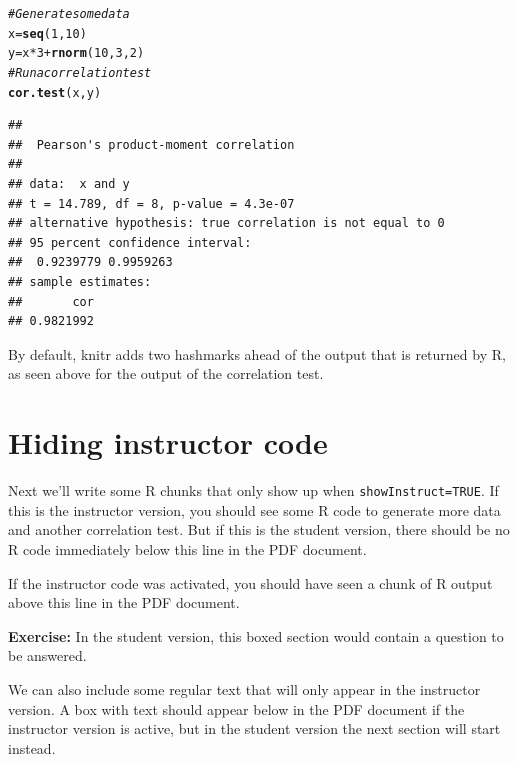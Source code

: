 \documentclass[letterpaper]{article}\usepackage[]{graphicx}\usepackage[]{color}
\makeatletter
\newcommand{\hlnum}[1]{\textcolor[rgb]{0.686,0.059,0.569}{#1}}%
\newcommand{\hlcom}[1]{\textcolor[rgb]{0.678,0.584,0.686}{\textit{#1}}}%
\newcommand{\hlopt}[1]{\textcolor[rgb]{0,0,0}{#1}}%
\newcommand{\hlstd}[1]{\textcolor[rgb]{0.345,0.345,0.345}{#1}}%
\newcommand{\hlkwb}[1]{\textcolor[rgb]{0.69,0.353,0.396}{#1}}%
\newcommand{\hlkwd}[1]{\textcolor[rgb]{0.737,0.353,0.396}{\textbf{#1}}}%
\newenvironment{kframe}{%
 \def\at@end@of@kframe{}%
 \ifinner\ifhmode%
  \def\at@end@of@kframe{\end{minipage}}%
  \begin{minipage}{\columnwidth}%
 \fi\fi%
 \def\FrameCommand##1{\hskip\@totalleftmargin \hskip-\fboxsep
 \colorbox{shadecolor}{##1}\hskip-\fboxsep
     \hskip-\linewidth \hskip-\@totalleftmargin \hskip\columnwidth}%
 \MakeFramed {\advance\hsize-\width
   \@totalleftmargin\z@ \linewidth\hsize
   \@setminipage}}%
 {\par\unskip\endMakeFramed%
 \at@end@of@kframe}
\newenvironment{knitrout}{}{} %
\makeatother
\begin{document}
\begin{knitrout}
\color{fgcolor}\begin{kframe}
\begin{alltt}
\hlcom{# Generate some data}
\hlstd{x} \hlkwb{=} \hlkwd{seq}\hlstd{(}\hlnum{1}\hlstd{,}\hlnum{10}\hlstd{)}
\hlstd{y} \hlkwb{=} \hlstd{x} \hlopt{*} \hlnum{3} \hlopt{+} \hlkwd{rnorm}\hlstd{(}\hlnum{10}\hlstd{,}\hlnum{3}\hlstd{,}\hlnum{2}\hlstd{)}
\hlcom{# Run a correlation test}
\hlkwd{cor.test}\hlstd{(x,y)}
\end{alltt}
\begin{verbatim}
## 
## 	Pearson's product-moment correlation
## 
## data:  x and y
## t = 14.789, df = 8, p-value = 4.3e-07
## alternative hypothesis: true correlation is not equal to 0
## 95 percent confidence interval:
##  0.9239779 0.9959263
## sample estimates:
##       cor 
## 0.9821992
\end{verbatim}
\end{kframe}
\end{knitrout}

By default, \textsf{knitr} adds two hashmarks ahead of the output that is 
returned by R, as seen above for the output of the correlation test. 

\section{Hiding instructor code}
Next we'll write some R chunks that only show up when 
\texttt{showInstruct=TRUE}. If this is the instructor version, you should see
some R code to generate more data and another correlation test. But if this
is the student version, there should be no R code immediately below this line
in the PDF document.



If the instructor code was activated, you should have seen a chunk of R 
output above this line in the PDF document. 

\begin{framed}
\textbf{Exercise:} In the student version, this boxed section would contain a 
question to be answered. 

\end{framed}

We can also include some regular text that will only appear in the 
instructor version. A box with text should appear below in the PDF document
if the instructor version is active, but in the student version the next section 
will start instead. 
\end{document}
